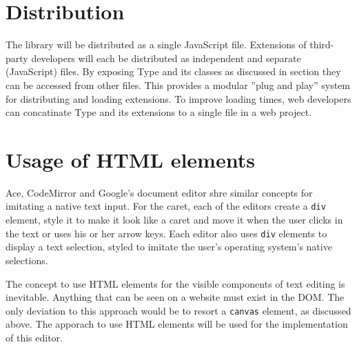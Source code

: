 


\section{Distribution}

The library will be distributed as a single JavaScript file. Extensions of third-party developers will each be distributed as independent and separate (JavaScript) files. By exposing Type and its classes as discussed in section  they can be accessed from other files. This provides a modular ''plug and play'' system for distributing and loading extensions. To improve loading times, web developers can concatinate Type and its extensions to a single file in a web project.

\section{Usage of HTML elements}

Ace, CodeMirror and Google's document editor shre similar concepts for imitating a native text input. For the caret, each of the editors create a \texttt{div} element, style it to make it look like a caret and move it when the user clicks in the text or uses his or her arrow keys. Each editor also uses \texttt{div} elements to display a text selection, styled to imitate the user's operating system's native selections. %

The concept to use HTML elements for the visible components of text editing is inevitable. Anything that can be seen on a website must exist in the DOM. The only deviation to this approach would be to resort a \texttt{canvas} element, as discussed above. The apporach to use HTML elements will be used for the implementation of this editor.

